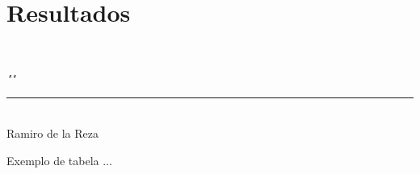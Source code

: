 
\chapter{Resultados}

\vspace{-1cm} 
~
\begin{flushright}
\begin{minipage}[t]{6cm}
{\footnotesize\textit{""}}\\
\rule[0.01mm]{6cm}{0.01mm}\\
{\footnotesize  Ramiro de la Reza}
\end{minipage}
\end{flushright}
\vspace{0.5cm}

Exemplo de tabela
...